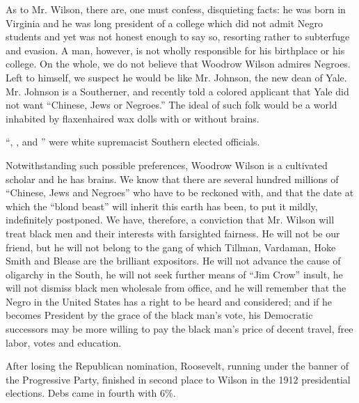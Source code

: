 \documentclass[letterpaper,10pt,english]{jupyterBook}
\begin{document}
\sphinxAtStartPar
As to Mr. Wilson, there are, one must confess, disquieting facts: he was born in Virginia and he was long president of a college which did not admit Negro students and yet was not honest enough to say so, resorting rather to subterfuge and evasion. A man, however, is not wholly responsible for his birthplace or his college. On the whole, we do not believe that Woodrow Wilson admires Negroes. Left to himself, we suspect he would be like Mr. Johnson, the new dean of Yale. Mr. Johnson is a Southerner, and recently told a colored applicant that Yale did not want “Chinese, Jews or Negroes.” The ideal of such folk would be a world inhabited by flaxen\sphinxhyphen{}haired wax dolls with or without brains.

\begin{sphinxShadowBox}
\sphinxstylesidebartitle{}

\sphinxAtStartPar
“, ,  and ” were white supremacist Southern elected officials.
\end{sphinxShadowBox}

\sphinxAtStartPar
Notwithstanding such possible preferences, Woodrow Wilson is a cultivated scholar and he has brains. We know that there are several hundred millions of “Chinese, Jews and Negroes” who have to be reckoned with, and that the date at which the “blond beast” will inherit this earth has been, to put it mildly, indefinitely postponed. We have, therefore, a conviction that Mr. Wilson will treat black men and their interests with farsighted fairness. He will not be our friend, but he will not belong to the gang of which Tillman, Vardaman, Hoke Smith and Blease are the brilliant expositors. He will not advance the cause of oligarchy in the South, he will not seek further means of “Jim Crow” insult, he will not dismiss black men wholesale from office, and he will remember that the Negro in the United States has a right to be heard and considered; and if he becomes President by the grace of the black man’s vote, his Democratic successors may be more willing to pay the black man’s price of decent travel, free labor, votes and education.

\begin{sphinxShadowBox}
\sphinxstylesidebartitle{}

\sphinxAtStartPar
After losing the Republican nomination, Roosevelt, running under the banner of the Progressive Party, finished in second place to Wilson in the 1912 presidential elections. Debs came in fourth with 6\%.
\end{sphinxShadowBox}
\end{document}
